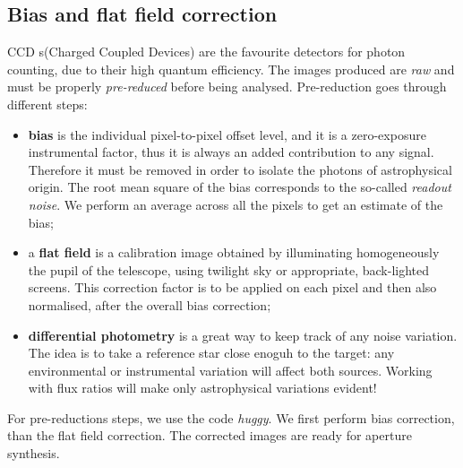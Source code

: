 \documentclass[a4paper,11pt,twocolumn]{article}
\begin{document}
\subsection{Bias and flat field correction}
CCD s(Charged Coupled Devices) are the favourite detectors for photon counting, 
due to their high quantum efficiency. The images produced are \textit{raw}
and must be properly \textit{pre-reduced} before being analysed. Pre-reduction 
goes through different steps:
\begin{itemize}
    \item \textbf{bias} is the
    individual pixel-to-pixel offset level, and it is a zero-exposure instrumental 
    factor, thus it is always an added contribution to any signal. Therefore it must 
    be removed in order to isolate the photons of astrophysical origin. The root mean square 
    of the bias corresponds to the so-called \textit{readout noise}. We perform an 
    average across all the pixels to get an estimate of the bias;
    \item a \textbf{flat field} is a calibration image obtained by illuminating
    homogeneously the pupil of the telescope, using twilight sky or appropriate, 
    back-lighted screens. This correction factor is to be applied on each pixel and 
    then also normalised, after the overall bias correction;
    \item \textbf{differential photometry} is a great way to keep track of any noise
    variation. The idea is to take a reference star close enoguh to the target: any 
    environmental or instrumental variation will affect both sources. Working with 
    flux ratios will make only astrophysical variations evident!
\end{itemize}
For pre-reductions steps, we use the code \textit{huggy}. We first perform bias
correction, than the flat field correction. The corrected images are ready for 
aperture synthesis.
\end{document}
